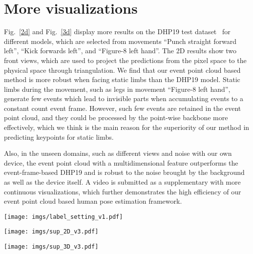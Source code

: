 \documentclass[10pt,twocolumn,letterpaper]{article}
\begin{document}
\section{More visualizations}
Fig.~\ref{2d} and Fig.~\ref{3d} display more results on the DHP19 test dataset~\cite{calabrese2019dhp19} for different models, which are selected from movements ``Punch straight forward left'', ``Kick forwards left'', and ``Figure-8 left hand''. 
The 2D results show two front views, which are used to project the predictions from the pixel space to the physical space through triangulation. 
We find that our event point cloud based method is more robust when facing static limbs than the DHP19 model. Static limbs during the movement, such as legs in movement ``Figure-8 left hand'', generate few events which lead to invisible parts when accumulating events to a constant count event frame. However, such few events are retained in the event point cloud, and they could be processed by the point-wise backbone more effectively, which we think is the main reason for the superiority of our method in predicting keypoints for static limbs. 

Also, in the unseen domains, such as different views and noise with our own device, the event point cloud with a multidimensional feature outperforms the event-frame-based DHP19 and is robust to the noise brought by the background as well as the device itself. 
A video is submitted as a supplementary with more continuous visualizations, which further demonstrates the high efficiency of our event point cloud based human pose estimation framework. 

\begin{figure*}[t]
\centering
\texttt{[image: imgs/label\_setting\_v1.pdf]}
\caption{Schematic diagram of label setting for event point cloud based human pose estimation. (a) The event point cloud output frequency of all four event cameras and the acquisition frequency of the motion capture device Vicon. (b) Determine the shared mean label for event camera 2 and event camera 3. (c) Determine the last label for event camera 2 and event camera 3, respectively. }
\label{label}
\end{figure*}

\begin{figure*}[b]
\centering
\texttt{[image: imgs/sup\_2D\_v3.pdf]}
\caption{2D results visualization with two front views on the DHP19 test dataset for different models (yellow for ground truth, blue for prediction). The three movements from top to bottom are ``Punch straight forward left'', ``Kick forwards left'', and ``Figure-8 left hand''.}
\label{2d}
\end{figure*}

\begin{figure*}[b]
\centering
\texttt{[image: imgs/sup\_3D\_v3.pdf]}
\caption{3D results visualization on the DHP19 test dataset for different models (red for ground truth, blue for prediction). The three movements from top to bottom are ``Punch straight forward left'', ``Kick forwards left'', and ``Figure-8 left hand''.}
\label{3d}
\end{figure*}
\end{document}
